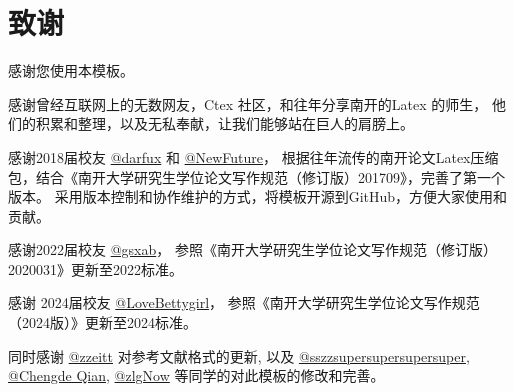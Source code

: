 
\chapter*{致谢}
 {
  \fangsong
  \setlength{\baselineskip}{16pt}
  \setlength{\parskip}{0pt}

  感谢您使用本模板。

  感谢曾经互联网上的无数网友，Ctex 社区，和往年分享南开的Latex 的师生，
  他们的积累和整理，以及无私奉献，让我们能够站在巨人的肩膀上。

  感谢2018届校友 \href{https://github.com/darfux}{@darfux} 和 \href{https://github.com/newfuture}{@NewFuture}，
  根据往年流传的南开论文Latex压缩包，结合《南开大学研究生学位论文写作规范（修订版）201709》，完善了第一个版本。
  采用版本控制和协作维护的方式，将模板开源到GitHub，方便大家使用和贡献。

  感谢2022届校友 \href{https://github.com/gsxab}{@gsxab}，
  参照《南开大学研究生学位论文写作规范（修订版）2020031》更新至2022标准。

  感谢 2024届校友 \href{https://github.com/lovebettygirl}{@LoveBettygirl}，
  参照《南开大学研究生学位论文写作规范（2024版）》更新至2024标准。

  同时感谢 \href{https://github.com/zzeitt}{@zzeitt} 对参考文献格式的更新,
  以及
  \href{https://github.com/sszzsupersupersupersuper}{@sszzsupersupersupersuper},
  \href{https://github.com/qianchd}{@Chengde Qian},
  \href{https://github.com/zlgnow}{@zlgNow}
  等同学的对此模板的修改和完善。

 }
